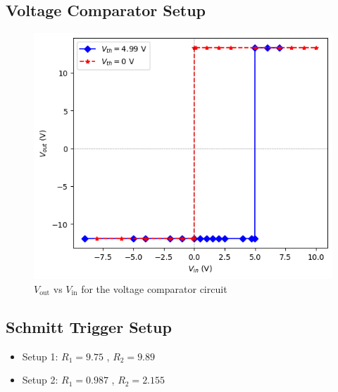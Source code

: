 \subsection{Voltage Comparator Setup}
    
    \begin{figure}[H]
        \centering
        \includegraphics[width=0.9\columnwidth]{images/ge.png}
        \caption{$V_\text{out}$ vs $V_\text{in}$ for the voltage comparator circuit}
        \label{g3}
    \end{figure}

\subsection{Schmitt Trigger Setup}
    \begin{itemize}
        \item Setup 1: $R_1=9.75$ \kohm, $R_2=9.89$ \kohm
        \item Setup 2: $R_1=0.987$ \kohm, $R_2=2.155$ \kohm
    \end{itemize}
    

